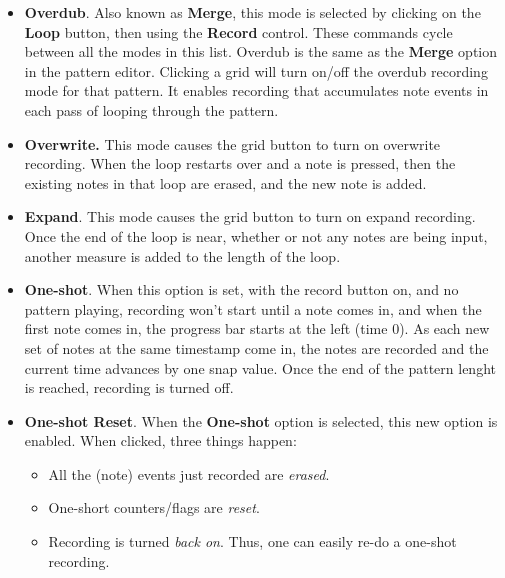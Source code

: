    \begin{itemize}
      \item \textbf{Overdub}.
         Also known as \textbf{Merge},
         this mode is selected by clicking on the \textbf{Loop} button,
         then using the \textbf{Record} control.
         These commands cycle between all the modes in this list.
         Overdub is the same as the \textbf{Merge} option in the 
         pattern editor.
         Clicking a grid will turn on/off the overdub recording mode
         for that pattern.
         It enables recording that accumulates note events in each pass of
         looping through the pattern.
      \item \textbf{Overwrite.}
         This mode causes the grid button to turn on overwrite recording.
         When the loop restarts over and a note is pressed,
         then the existing notes in that loop are erased,
         and the new note is added.
      \item \textbf{Expand}.
         This mode causes the grid button to turn on expand recording.
         Once the end of the loop is near, whether or
         not any notes are being input, another measure is added to the length
         of the loop.
      \item \textbf{One-shot}.
         When this option is set, with the record button on, and no pattern
         playing, recording won't start until a note comes in, and when the
         first note comes in, the progress bar starts at the left (time 0).
         As each new set of notes at the same timestamp come in, the
         notes are recorded and the current time advances by one snap value.
         Once the end of the pattern lenght is reached, recording is turned
         off.
      \item \textbf{One-shot Reset}.
         When the \textbf{One-shot} option is selected, this new option
         is enabled.
         When clicked, three things happen:
         \begin{itemize}
            \item All the (note) events just recorded are \textsl{erased}.
            \item One-short counters/flags are \textsl{reset}.
            \item Recording is turned \textsl{back on}.
               Thus, one can easily re-do a one-shot recording.
         \end{itemize}
   \end{itemize}

